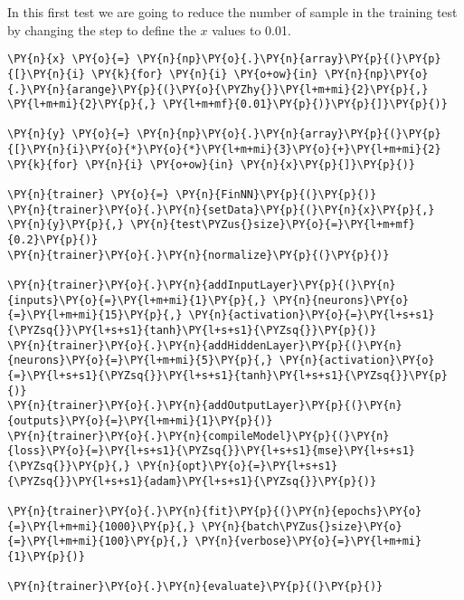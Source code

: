 \begin{Answer}
In this first test we are going to reduce the number of sample in the training test by changing the step to define the $x$ values to 0.01.

\begin{tcolorbox}[size=fbox, boxrule=1pt, colback=cellbackground, colframe=cellborder]
\begin{Verbatim}[commandchars=\\\{\}]
\PY{n}{x} \PY{o}{=} \PY{n}{np}\PY{o}{.}\PY{n}{array}\PY{p}{(}\PY{p}{[}\PY{n}{i} \PY{k}{for} \PY{n}{i} \PY{o+ow}{in} \PY{n}{np}\PY{o}{.}\PY{n}{arange}\PY{p}{(}\PY{o}{\PYZhy{}}\PY{l+m+mi}{2}\PY{p}{,} \PY{l+m+mi}{2}\PY{p}{,} \PY{l+m+mf}{0.01}\PY{p}{)}\PY{p}{]}\PY{p}{)}
	
\PY{n}{y} \PY{o}{=} \PY{n}{np}\PY{o}{.}\PY{n}{array}\PY{p}{(}\PY{p}{[}\PY{n}{i}\PY{o}{*}\PY{o}{*}\PY{l+m+mi}{3}\PY{o}{+}\PY{l+m+mi}{2} \PY{k}{for} \PY{n}{i} \PY{o+ow}{in} \PY{n}{x}\PY{p}{]}\PY{p}{)}
	
\PY{n}{trainer} \PY{o}{=} \PY{n}{FinNN}\PY{p}{(}\PY{p}{)}
\PY{n}{trainer}\PY{o}{.}\PY{n}{setData}\PY{p}{(}\PY{n}{x}\PY{p}{,} \PY{n}{y}\PY{p}{,} \PY{n}{test\PYZus{}size}\PY{o}{=}\PY{l+m+mf}{0.2}\PY{p}{)}
\PY{n}{trainer}\PY{o}{.}\PY{n}{normalize}\PY{p}{(}\PY{p}{)}
	
\PY{n}{trainer}\PY{o}{.}\PY{n}{addInputLayer}\PY{p}{(}\PY{n}{inputs}\PY{o}{=}\PY{l+m+mi}{1}\PY{p}{,} \PY{n}{neurons}\PY{o}{=}\PY{l+m+mi}{15}\PY{p}{,} \PY{n}{activation}\PY{o}{=}\PY{l+s+s1}{\PYZsq{}}\PY{l+s+s1}{tanh}\PY{l+s+s1}{\PYZsq{}}\PY{p}{)}
\PY{n}{trainer}\PY{o}{.}\PY{n}{addHiddenLayer}\PY{p}{(}\PY{n}{neurons}\PY{o}{=}\PY{l+m+mi}{5}\PY{p}{,} \PY{n}{activation}\PY{o}{=}\PY{l+s+s1}{\PYZsq{}}\PY{l+s+s1}{tanh}\PY{l+s+s1}{\PYZsq{}}\PY{p}{)}
\PY{n}{trainer}\PY{o}{.}\PY{n}{addOutputLayer}\PY{p}{(}\PY{n}{outputs}\PY{o}{=}\PY{l+m+mi}{1}\PY{p}{)}
\PY{n}{trainer}\PY{o}{.}\PY{n}{compileModel}\PY{p}{(}\PY{n}{loss}\PY{o}{=}\PY{l+s+s1}{\PYZsq{}}\PY{l+s+s1}{mse}\PY{l+s+s1}{\PYZsq{}}\PY{p}{,} \PY{n}{opt}\PY{o}{=}\PY{l+s+s1}{\PYZsq{}}\PY{l+s+s1}{adam}\PY{l+s+s1}{\PYZsq{}}\PY{p}{)}
	
\PY{n}{trainer}\PY{o}{.}\PY{n}{fit}\PY{p}{(}\PY{n}{epochs}\PY{o}{=}\PY{l+m+mi}{1000}\PY{p}{,} \PY{n}{batch\PYZus{}size}\PY{o}{=}\PY{l+m+mi}{100}\PY{p}{,} \PY{n}{verbose}\PY{o}{=}\PY{l+m+mi}{1}\PY{p}{)}
	
\PY{n}{trainer}\PY{o}{.}\PY{n}{evaluate}\PY{p}{(}\PY{p}{)}
\end{Verbatim}
\end{tcolorbox}


\end{Answer}
